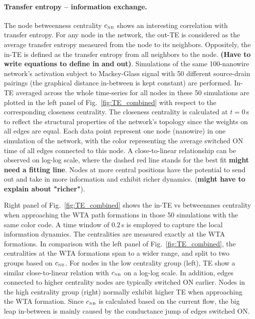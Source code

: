 \documentclass[fleqn,10pt,  reprint, amsmath,amssymb,aps, floatfix]{wlscirep}
\newcommand{\cNB}{c_{\scriptscriptstyle \rm NB}}
\begin{document}
\paragraph{Transfer entropy -- information exchange.}
The node betweenness centrality $\cNB$ shows an interesting correlation with transfer entropy. For any node in the network, the out-TE is considered as the average transfer entropy measured from the node to its neighbors. Oppositely, the in-TE is defined as the transfer entropy from all neighbors to the node. \textbf{(Have to write equations to define in and out)}. Simulations of the same 100-nanowire network's activation subject to Mackey-Glass signal with 50 different source-drain pairings (the graphical distance in-between is kept constant) are performed. In-TE averaged across the whole time-series for all nodes in these 50 simulations are plotted in the left panel of Fig.~\ref{fig:TE_combined} with respect to the corresponding closeness centrality. The closeness centrality is calculated at $t = 0\,$s to reflect the structural properties of the network's topology since the weights on all edges are equal. Each data point represent one node (nanowire) in one simulation of the network, with the color representing the average switched ON time of all edges connected to this node. A close-to-linear relationship can be observed on log-log scale, where the dashed red line stands for the best fit \textbf{might need a fitting line}. Nodes at more central positions have the potential to send out and take in more information and exhibit richer dynamics. (\textbf{might have to explain about "richer"}).

Right panel of Fig.~\ref{fig:TE_combined} shows the in-TE vs betweennnes centrality when approaching the WTA path formations in those 50 simulations with the same color code. A time window of $0.2 \,$s is employed to capture the local information dynamics. The centralities are measured exactly at the WTA formations. In comparison with the left panel of Fig.~\ref{fig:TE_combined}, the centralities at the WTA formations span to a wider range, and split to two groups based on $\cNB$. For nodes in the low centrality group (left), TE show a similar close-to-linear relation with $\cNB$ on a log-log scale. In addition, edges connected to higher centrality nodes are typically switched ON earlier. Nodes in the high centrality group (right) normally exhibit higher TE when approaching the WTA formation. Since $\cNB$ is calculated based on the current flow, the big leap in-between is mainly caused by the conductance jump of edges switched ON.
\end{document}
